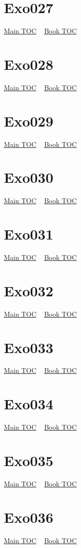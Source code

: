 \documentclass{book}
\begin{document}
  \section{Exo027}\hyperlink{toc}{Main TOC} ~ \hyperref[subsec:Exo]{Book TOC} 
  \section{Exo028}\hyperlink{toc}{Main TOC} ~ \hyperref[subsec:Exo]{Book TOC} 
  \section{Exo029}\hyperlink{toc}{Main TOC} ~ \hyperref[subsec:Exo]{Book TOC} 
  \section{Exo030}\hyperlink{toc}{Main TOC} ~ \hyperref[subsec:Exo]{Book TOC} 
  \section{Exo031}\hyperlink{toc}{Main TOC} ~ \hyperref[subsec:Exo]{Book TOC} 
  \section{Exo032}\hyperlink{toc}{Main TOC} ~ \hyperref[subsec:Exo]{Book TOC} 
  \section{Exo033}\hyperlink{toc}{Main TOC} ~ \hyperref[subsec:Exo]{Book TOC} 
  \section{Exo034}\hyperlink{toc}{Main TOC} ~ \hyperref[subsec:Exo]{Book TOC} 
  \section{Exo035}\hyperlink{toc}{Main TOC} ~ \hyperref[subsec:Exo]{Book TOC} 
  \section{Exo036}\hyperlink{toc}{Main TOC} ~ \hyperref[subsec:Exo]{Book TOC} 
\end{document}
